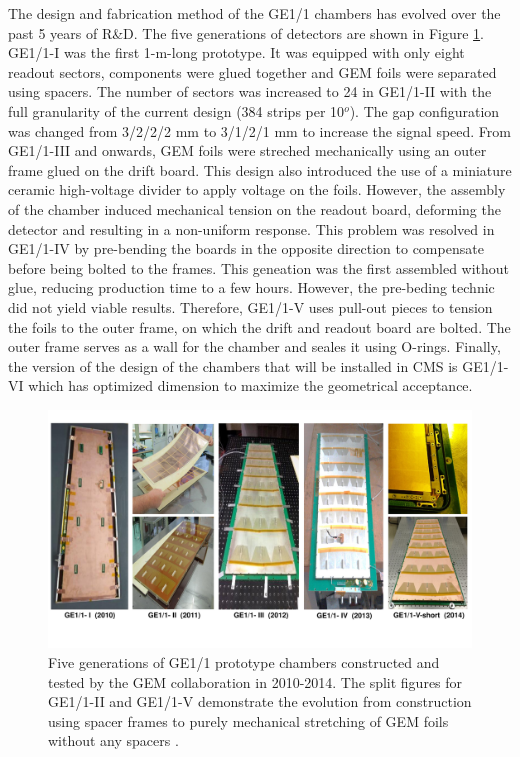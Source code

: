     The design and fabrication method of the GE1/1 chambers has evolved over the past 5 years of R\&D. The five generations of detectors are shown in Figure \ref{fig:II-1-generations}. GE1/1-I was the first 1-m-long prototype. It was equipped with only eight readout sectors, components were glued together and GEM foils were separated using spacers. The number of sectors was increased to 24 in GE1/1-II with the full granularity of the current design (384 strips per 10$^o$). The gap configuration was changed from 3/2/2/2 mm to 3/1/2/1 mm to increase the signal speed. From GE1/1-III and onwards, GEM foils were streched mechanically using an outer frame glued on the drift board. This design also introduced the use of a miniature ceramic high-voltage divider to apply voltage on the foils. However, the assembly of the chamber induced mechanical tension on the readout board, deforming the detector and resulting in a non-uniform response. This problem was resolved in GE1/1-IV by pre-bending the boards in the opposite direction to compensate before being bolted to the frames. This geneation was the first assembled without glue, reducing production time to a few hours. However, the pre-beding technic did not yield viable results. Therefore, GE1/1-V uses pull-out pieces to tension the foils to the outer frame, on which the drift and readout board are bolted. The outer frame serves as a wall for the chamber and seales it using O-rings. Finally, the version of the design of the chambers that will be installed in CMS is GE1/1-VI which has optimized dimension to maximize the geometrical acceptance.

    \begin{figure}[h!]
      \centering
      \includegraphics[width=\textwidth]{img/II-1-gem/generations.pdf}
      \caption{Five generations of GE1/1 prototype chambers constructed and tested by the GEM collaboration in 2010-2014. The split figures for GE1/1-II and GE1/1-V demonstrate the evolution from construction using spacer frames to purely mechanical stretching of GEM foils without any spacers \cite{Colaleo:2021453}.}
      \label{fig:II-1-generations}
    \end{figure}

